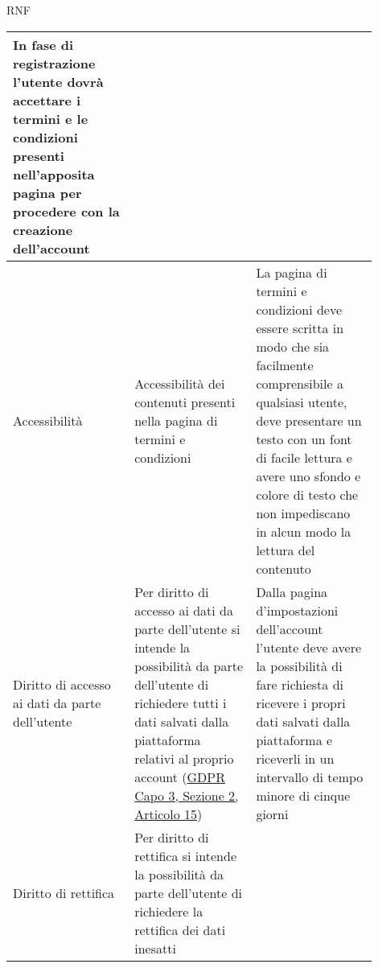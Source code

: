 \begin{listaPersonale}{RNF}
\begin{tabular}{|p{0.3\linewidth}|p{0.3\linewidth}|p{0.3\linewidth}|}
        In fase di registrazione l'utente dovrà accettare i termini
        e le condizioni presenti nell'apposita pagina per procedere
        con la creazione dell'account                                                                                                                                                                                          \\
        \hline
        Accessibilità                                                                                                                             &
        Accessibilità dei contenuti presenti nella pagina di
        termini e condizioni                                                                                                                      &
        La pagina di termini e condizioni deve essere scritta in
        modo che sia facilmente comprensibile a qualsiasi utente,
        deve presentare un testo con un font di facile lettura e
        avere uno sfondo e colore di testo che non impediscano in
        alcun modo la lettura del contenuto                                                                                                                                                                                    \\
        \hline
        Diritto di accesso ai dati da parte dell'utente                                                                                           &
        Per diritto di accesso ai dati da parte dell'utente si
        intende la possibilità da parte dell'utente di richiedere
        tutti i dati salvati dalla piattaforma relativi al proprio
        account (\href{https://eur-lex.europa.eu/legal-content/IT/TXT/?uri=uriserv:OJ.L_.2016.119.01.0001.01.ITA                                  & toc=OJ:L:2016:119:TOC#d1e2520-1-1}{GDPR Capo 3, Sezione 2, Articolo 15}) &
        Dalla pagina d'impostazioni dell'account l'utente deve avere
        la possibilità di fare richiesta di ricevere i propri dati
        salvati dalla piattaforma e riceverli in un intervallo di
        tempo minore di cinque giorni                                                                                                                                                                                          \\
        \hline
        Diritto di rettifica                                                                                                                      &
        Per diritto di rettifica si intende la possibilità da parte
        dell'utente di richiedere la rettifica dei dati inesatti

\end{tabular}
\end{listaPersonale}
